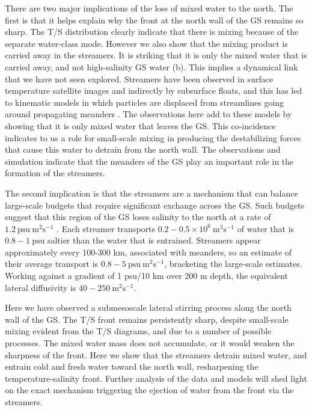 \documentclass{article}
\begin{document}
There are two major implications of the loss of  mixed water to the north.  The first is that it helps explain why the front at the north wall of the GS remains so sharp.  The T/S distribution clearly indicate that there is mixing because of the separate water-class mode.  However we also show that the mixing product is carried away in the streamers.  It is striking that it is only the mixed water that is carried away, and not high-salinity GS water (b).  This implies a dynamical link that we have not seen explored.  Streamers have been observed in surface temperature  satellite images and indirectly by subsurface floats\cite{bowerrossby89,flierletal87,lozieretal97,songetal95}, and this has led to kinematic models in which particles are displaced from streamlines going around propagating meanders \cite{bower91,prattetal95,lozieretal97}. The observations here add to these models by showing that it is only mixed water that leaves the GS.  This co-incidence indicates to us a role for small-scale mixing in producing the destabilizing forces that cause this water to detrain from the north wall.  The observations and simulation indicate that the meanders of the GS play an important role in the formation of the streamers.

The second implication is that the streamers are a mechanism that can balance large-scale budgets that require significant exchange across the GS\cite{joyceetal13,boweretal85}. Such budgets suggest that this region of the GS loses salinity to the north at a rate of $1.2\ \mathrm{psu\  m^2 s^{-1}}$ \cite{joyceetal13}.  Each streamer transports $0.2-0.5 \times 10^6\ \mathrm{m^3 s^{-1}}$ of water that is $0.8-1\ \mathrm{psu}$ saltier than the water that is entrained.  Streamers appear approximately every 100-300 km, associated with meanders, so an estimate of their average transport is $0.8-5\ \mathrm{psu\ m^2s^{-1}}$, bracketing the large-scale estimates.  Working against a gradient of 1 psu/10 km over 200 m depth, the equivalent lateral diffusivity is $40-250\ \mathrm{m^2s^{-1}}$.

Here we have observed a submesoscale lateral stirring process along the north wall of the GS.  The T/S front remains persistently sharp, despite small-scale mixing evident from the T/S diagrams, and due to a number of possible processes\cite{thomasshakespeare15,whittthomas13}. The mixed water mass does not accumulate, or it would weaken the sharpness of the front. Here we show that the streamers detrain mixed water, and entrain cold and fresh water toward the north wall, resharpening the temperature-salinity front. Further analysis of the data and models will shed light on the exact mechanism triggering the ejection of water from the front via the streamers.
\end{document}
